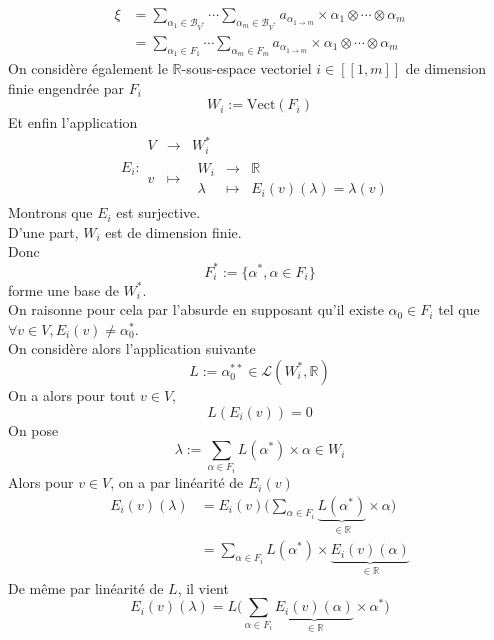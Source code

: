 \documentclass[../geometrie.tex]{subfiles}
\begin{document}
{{\begin{itemize}
$$\begin{aligned}
							\xi & = \sum_{\alpha_{1} \in \mathcal{B}_{V^{*}}} \cdots \sum_{\alpha_{m} \in \mathcal{B}_{V^{*}}} a_{\alpha_{1 \to m}} \times \alpha_{1} \otimes \cdots \otimes \alpha_{m} \\
							& = \sum_{\alpha_{1} \in F_{1}} \cdots \sum_{\alpha_{m} \in F_{m}} a_{\alpha_{1 \to m}} \times \alpha_{1} \otimes \cdots \otimes \alpha_{m}
						\end{aligned}
					$$
					On considère également le $\mathbb{R}$-sous-espace vectoriel $i \in [\![1, m]\!]$ de dimension finie engendrée par $F_{i}$
					$$
						W_{i} := \mathrm{Vect}(F_{i})
					$$
					Et enfin l'application
					$$
						E_{i} :
						\begin{array}{rcl}
							V & \longrightarrow & W_{i}^{*} \\
							v & \longmapsto &
							\begin{array}{rcl}
								W_{i} & \longrightarrow & \mathbb{R} \\
								\lambda & \longmapsto & E_{i}(v)(\lambda) = \lambda(v)
							\end{array}
						\end{array}
					$$
					Montrons que $E_{i}$ est surjective. \\
					D'une part, $W_{i}$ est de dimension finie. \\
					Donc
					$$
						F_{i}^{*} := \{ \alpha^{*}, \alpha \in F_{i} \}
					$$
					forme une base de $W_{i}^{*}$. \\
					On raisonne pour cela par l'absurde en supposant qu'il existe $\alpha_{0} \in F_{i}$ tel que $\forall v \in V, E_{i}(v) \neq \alpha_{0}^{*}$. \\
					On considère alors l'application suivante
					$$
						L := \alpha_{0}^{**} \in \mathcal{L}(W_{i}^{*}, \mathbb{R})
					$$
					On a alors pour tout $v \in V$,
					$$
						L(E_{i}(v)) = 0
					$$
					On pose
					$$
						\lambda := \sum_{\alpha \in F_{i}} L(\alpha^{*}) \times \alpha \in W_{i}
					$$
					Alors pour $v \in V$, on a par linéarité de $E_{i}(v)$
					$$
						\begin{aligned}
							E_{i}(v)(\lambda) & = E_{i}(v) \! \Biggl( \sum_{\alpha \in F_{i}} \underset{\in \mathbb{R}}{\underbrace{L(\alpha^{*})}} \times \alpha \Biggr) \\
							& = \sum_{\alpha \in F_{i}} L(\alpha^{*}) \times \underset{\in \mathbb{R}}{\underbrace{E_{i}(v)(\alpha)}}
						\end{aligned}
					$$
					De même par linéarité de $L$, il vient
					$$
						E_{i}(v)(\lambda) = L \! \Biggl( \sum_{\alpha \in F_{i}} \underset{\in \mathbb{R}}{\underbrace{E_{i}(v)(\alpha)}} \times \alpha^{*} \Biggr)
$$
\end{itemize}}}
\end{document}
